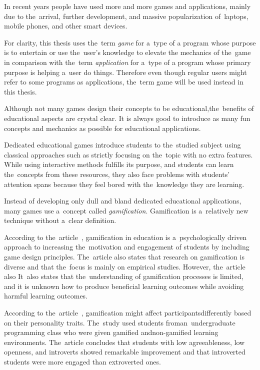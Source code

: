 In recent years people have used more and more games and applications, mainly due to the~arrival, further development, and massive popularization of~laptops, mobile phones, and other smart devices.

For clarity, this thesis uses the~term \emph{game} for a~type of a program whose purpose is to entertain or use the~user's knowledge to elevate the mechanics of the~game in comparison with the~term \emph{application} for a~type of a program whose primary purpose is helping a~user do things.
Therefore even though regular users might refer to some programs as applications, the~term game will be used instead in this thesis.

Although not many games design their concepts to be educational,\linebreak{}the~benefits of educational aspects are crystal clear.
It is always good to introduce as many fun concepts and mechanics as possible for educational applications.

Dedicated educational games introduce students to the~studied subject using classical approaches such as strictly focusing on the~topic with no extra features.
While using interactive methods fulfills its purpose, and students can learn the~concepts from these resources, they also face problems with students' attention spans because they feel bored with the~knowledge they are learning.

Instead of developing only dull and bland dedicated educational applications, many games use a~concept called \emph{gamification}.
Gamification is a~relatively new technique without a~clear definition.

According to the~article~\cite{dichev_2017_gamifying}, gamification in education is a~psychologically driven approach to increasing the~motivation and engagement of students by including game design principles.
The~article also states that research on gamification is diverse and that the~focus is mainly on empirical studies. However, the~article also 
It~also states that the~understanding of gamification processes is limited, and it is \mbox{unknown} how to produce beneficial learning outcomes while avoiding harmful learning outcomes. 

\pagebreak
According to the~article~\cite{smiderle_2020_the}, gamification might affect participants\linebreak{}differently based on their personality traits.
The~study used students from\linebreak{}an~undergraduate programming class who were given gamified and\linebreak{}non-gamified learning environments.
The~article concludes that students with low agreeableness, low openness, and introverts showed remarkable improvement and that introverted students were more engaged than extroverted ones.

